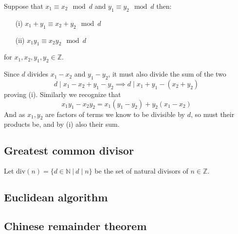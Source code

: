 \begin{prop}
    Suppose that $x_{1}\equiv x_{2}\mod d$ and $y_{1}\equiv y_{2}\mod d$ then:
    \begin{itemize}
        \item[(i)] $x_{1}+y_{1}\equiv x_{2}+y_{2}\mod d$
        \item[(ii)] $x_{1}y_{1}\equiv x_{2}y_{2}\mod d$
    \end{itemize}
    for $x_{1},x_{2},y_{1},y_{2}\in\mathbb{Z}$.
\end{prop}
\begin{prf}
    Since $d$ divides $x_{1}-x_{2}$ and $y_{1}-y_{2}$, it must also divide the sum of the two
    \[
        d\mid x_{1}-x_{2}+y_{1}-y_{2}\implies d\mid x_{1}+y_{1}-(x_{2}+y_{2})
    \]
    proving (i). Similarly we recognize that
    \[
        x_{1}y_{1}-x_{2}y_{2}=x_{1}(y_{1}-y_{2})+y_{2}(x_{1}-x_{2})
    \]
    And as $x_{1},y_{2}$ are factors of terms we know to be divisible by $d$, so must their products be, and by (i) also their sum.
\end{prf}
\subsection{Greatest common divisor}
\begin{defi}
    Let $\text{div}(n)=\{d\in\mathbb{N}~|~d\mid n\}$ be the set of natural divisors of $n\in\mathbb{Z}$.
\end{defi}

\subsection{Euclidean algorithm}
\subsection{Chinese remainder theorem}
